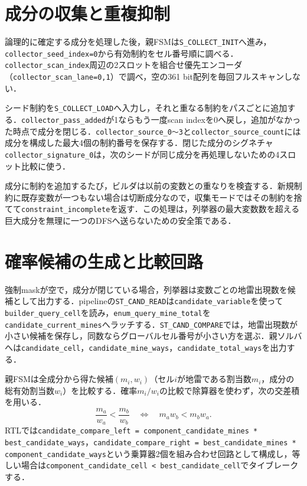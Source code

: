 \section{成分の収集と重複抑制}
\label{sec:component-collector}

論理的に確定する成分を処理した後，親FSMは\texttt{S\_COLLECT\_INIT}へ進み，\texttt{collector\_seed\_index=0}から有効制約をセル番号順に調べる．\texttt{collector\_scan\_index}周辺の2スロットを組合せ優先エンコーダ（\texttt{collector\_scan\_lane=0,1}）で調べ，空の361 bit配列を毎回フルスキャンしない．

シード制約を\texttt{S\_COLLECT\_LOAD}へ入力し，それと重なる制約をパスごとに追加する．\texttt{collector\_pass\_added}が1ならもう一度scan indexを0へ戻し，追加がなかった時点で成分を閉じる．\texttt{collector\_source\_0〜3}と\texttt{collector\_source\_count}には成分を構成した最大4個の制約番号を保存する．閉じた成分のシグネチャ\texttt{collector\_signature\_0}は，次のシードが同じ成分を再処理しないための4スロット比較に使う．

成分に制約を追加するたび，ビルダは以前の変数との重なりを検査する．新規制約に既存変数が一つもない場合は切断成分なので，収集モードではその制約を捨てて\texttt{constraint\_incomplete}を返す．この処理は，列挙器の最大変数数を超える巨大成分を無理に一つのDFSへ送らないための安全策である．

\section{確率候補の生成と比較回路}
\label{sec:component-candidate}

強制maskが空で，成分が閉じている場合，列挙器は変数ごとの地雷出現数を候補として出力する．pipelineの\texttt{ST\_CAND\_READ}は\texttt{candidate\_variable}を使って\texttt{builder\_query\_cell}を読み，\texttt{enum\_query\_mine\_total}を\texttt{candidate\_current\_mines}へラッチする．\texttt{ST\_CAND\_COMPARE}では，地雷出現数が小さい候補を保存し，同数ならグローバルセル番号が小さい方を選ぶ．親ソルバへは\texttt{candidate\_cell}，\texttt{candidate\_mine\_ways}，\texttt{candidate\_total\_ways}を出力する．

親FSMは全成分から得た候補$(m_i,w_i)$（セル$i$が地雷である割当数$m_i$，成分の総有効割当数$w_i$）を比較する．確率$m_i/w_i$の比較で除算器を使わず，次の交差積を用いる．
\begin{equation}
  \frac{m_a}{w_a}<\frac{m_b}{w_b}
  \quad\Longleftrightarrow\quad
  m_a w_b < m_b w_a.
  \label{eq:cross-product}
\end{equation}
RTLでは\texttt{candidate\_compare\_left = component\_candidate\_mines * best\_candidate\_ways}，\texttt{candidate\_compare\_right = best\_candidate\_mines * component\_candidate\_ways}という乗算器2個を組み合わせ回路として構成し，等しい場合は\texttt{component\_candidate\_cell < best\_candidate\_cell}でタイブレークする．

